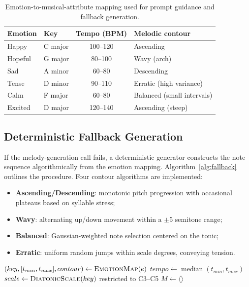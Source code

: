 \begin{table}[ht]
\centering
\caption[Emotion-to-musical-attribute mapping]{Emotion-to-musical-attribute
mapping used for prompt guidance and fallback generation.}
\label{tab:emotion-mapping}
\begin{tabular}{l l c l}
\toprule
\textbf{Emotion} & \textbf{Key} & \textbf{Tempo (BPM)} & \textbf{Melodic
contour} \\
\midrule
Happy   & C major & 100--120 & Ascending \\
Hopeful & G major & 80--100  & Wavy (arch) \\
Sad     & A minor & 60--80   & Descending \\
Tense   & D minor & 90--110  & Erratic (high variance) \\
Calm    & F major & 60--80   & Balanced (small intervals) \\
Excited & D major & 120--140 & Ascending (steep) \\
\bottomrule
\end{tabular}
\end{table}

\subsection{Deterministic Fallback Generation}
\label{sec:mt-fallback}

If the melody-generation call fails, a deterministic generator constructs
the note sequence algorithmically from the emotion mapping.
Algorithm~\ref{alg:fallback} outlines the procedure. Four contour algorithms
are implemented:

\begin{itemize}
    \item \textbf{Ascending/Descending}: monotonic pitch progression with
    occasional plateaus based on syllable stress;
    \item \textbf{Wavy}: alternating up/down movement within a $\pm5$
    semitone range;
    \item \textbf{Balanced}: Gaussian-weighted note selection centered on
    the tonic;
    \item \textbf{Erratic}: uniform random jumps within scale degrees,
    conveying tension.
\end{itemize}

\begin{algorithm}[ht]
\caption{Deterministic fallback melody generation}
\label{alg:fallback}
$(key, [t_{min}, t_{max}], contour) \leftarrow \textsc{EmotionMap}(e)$\;
$tempo \leftarrow \operatorname{median}(t_{min}, t_{max})$\;
$scale \leftarrow \textsc{DiatonicScale}(key)$ restricted to C3--C5\;
$M \leftarrow \langle\rangle$\;
\end{algorithm}

